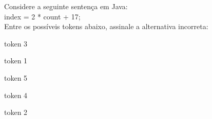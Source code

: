 \question[10]

Considere a seguinte sentença em Java:\\
index = 2 * count + 17;\\
Entre os possíveis tokens abaixo, assinale a alternativa incorreta:\\
\begin{choices}
\item token 3 
\item token 1 
\item token 5 %
\item token 4
\item token 2
\end{choices}
\answerline

